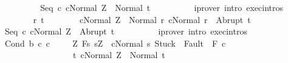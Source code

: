 \begin{isabellebody}
\ \ \ \ \ \ \isamarkupfalse%
\ \isamarkupfalse%
\ {\isachardoublequoteopen}{\isasymGamma}{\isasymturnstile}{\isasymlangle}Seq\ c{}\ c{}{\isacharcomma}Normal\ Z{\isasymrangle}\ {\isasymRightarrow}\ Normal\ t{\isachardoublequoteclose}\isanewline
\ \ \ \ \ \ \ \ \isamarkupfalse%
\ {\isacharparenleft}iprover\ intro{\isacharcolon}\ exec{\isachardot}intros{\isacharparenright}\isanewline
\ \ \ \ \isamarkupfalse%
\isanewline
\ \ \ \ \ \ \isamarkupfalse%
\ r\ t\isanewline
\ \ \ \ \ \ \isamarkupfalse%
\ {\isachardoublequoteopen}{\isasymGamma}{\isasymturnstile}{\isasymlangle}c{}{\isacharcomma}Normal\ Z{\isasymrangle}\ {\isasymRightarrow}\ Normal\ r{\isachardoublequoteclose}\ {\isachardoublequoteopen}{\isasymGamma}{\isasymturnstile}{\isasymlangle}c{}{\isacharcomma}Normal\ r{\isasymrangle}\ {\isasymRightarrow}\ Abrupt\ t{\isachardoublequoteclose}\isanewline
\ \ \ \ \ \ \isamarkupfalse%
\ \isamarkupfalse%
\ {\isachardoublequoteopen}{\isasymGamma}{\isasymturnstile}{\isasymlangle}Seq\ c{}\ c{}{\isacharcomma}Normal\ Z{\isasymrangle}\ {\isasymRightarrow}\ Abrupt\ t{\isachardoublequoteclose}\isanewline
\ \ \ \ \ \ \ \ \isamarkupfalse%
\ {\isacharparenleft}iprover\ intro{\isacharcolon}\ exec{\isachardot}intros{\isacharparenright}\isanewline
\ \ \ \ \isamarkupfalse%
\isanewline
\ \ \isamarkupfalse%
\isanewline
{}\isamarkupfalse%
\isanewline
\ \ \isamarkupfalse%
\ {\isacharparenleft}Cond\ b\ c{}\ c{}{\isacharparenright}\ \isanewline
\ \ \isamarkupfalse%
\ {\isachardoublequoteopen}{\isasymforall}Z{\isachardot}\ {\isasymGamma}{\isacharcomma}{\isasymTheta}{\isasymturnstile}\isactrlbsub {\isacharslash}F\isactrlesub {\isacharbraceleft}s{\isachardot}\ s{\isacharequal}Z\ {\isasymand}\ {\isasymGamma}{\isasymturnstile}{\isasymlangle}c{}{\isacharcomma}Normal\ s{\isasymrangle}\ {\isasymRightarrow}{\isasymnotin}{\isacharparenleft}{\isacharbraceleft}Stuck{\isacharbraceright}\ {\isasymunion}\ Fault\ {\isacharbackquote}\ {\isacharparenleft}{\isacharminus}F{\isacharparenright}{\isacharparenright}{\isacharbraceright}\ c{}\ \isanewline
\ \ \ \ \ \ \ \ \ \ \ \ \ \ \ \ \ {\isacharbraceleft}t{\isachardot}\ {\isasymGamma}{\isasymturnstile}{\isasymlangle}c{}{\isacharcomma}Normal\ Z{\isasymrangle}\ {\isasymRightarrow}\ Normal\ t{\isacharbraceright}{\isacharcomma}\isanewline

\end{isabellebody}
